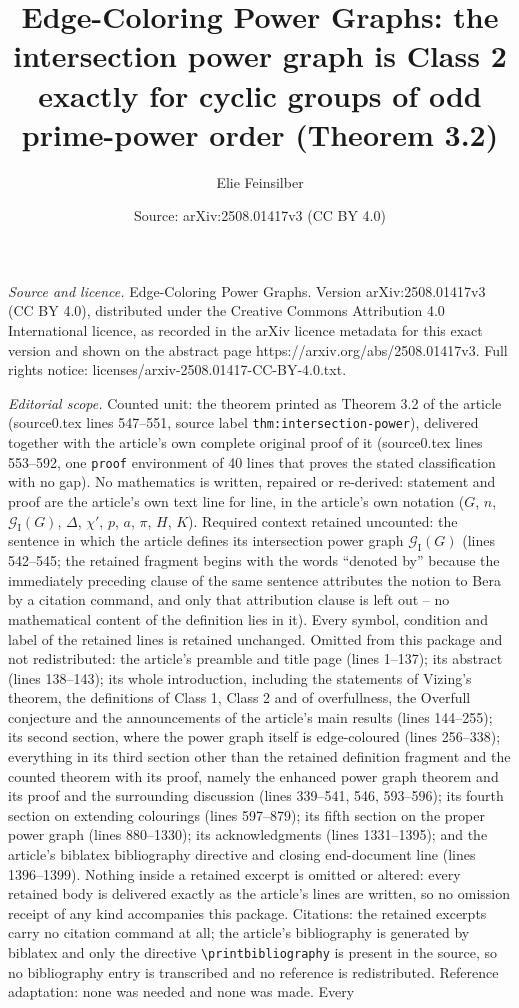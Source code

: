 \documentclass[10pt,a4paper]{amsart}
\title[Edge-coloring the intersection power graph (Theorem 3.2)]{Edge-Coloring Power Graphs: the intersection power graph is Class 2 exactly for cyclic groups of odd prime-power order (Theorem 3.2)}
\author{Elie Feinsilber}
\date{Source: arXiv:2508.01417v3 (CC BY 4.0)}
\begin{document}
\maketitle

\noindent\emph{Source and licence.} Edge-Coloring Power Graphs. Version arXiv:2508.01417v3 (CC BY 4.0), distributed under the Creative Commons Attribution 4.0 International licence, as recorded in the arXiv licence metadata for this exact version and shown on the abstract page https://arxiv.org/abs/2508.01417v3. Full rights notice: licenses/arxiv-2508.01417-CC-BY-4.0.txt.\par\smallskip

\noindent\textit{Editorial scope.} Counted unit: the theorem printed as Theorem 3.2 of the article (source0.tex lines 547--551, source label \texttt{thm:intersection-power}), delivered together with the article's own complete original proof of it (source0.tex lines 553--592, one \texttt{proof} environment of 40 lines that proves the stated classification with no gap). No mathematics is written, repaired or re-derived: statement and proof are the article's own text line for line, in the article's own notation ($G$, $n$, $\mathscr{G}_{\mathrm{I}}(G)$, $\Delta$, $\chi'$, $p$, $a$, $\pi$, $H$, $K$). Required context retained uncounted: the sentence in which the article defines its intersection power graph $\mathscr{G}_{\mathrm{I}}(G)$ (lines 542--545; the retained fragment begins with the words ``denoted by'' because the immediately preceding clause of the same sentence attributes the notion to Bera by a citation command, and only that attribution clause is left out -- no mathematical content of the definition lies in it). Every symbol, condition and label of the retained lines is retained unchanged. Omitted from this package and not redistributed: the article's preamble and title page (lines 1--137); its abstract (lines 138--143); its whole introduction, including the statements of Vizing's theorem, the definitions of Class 1, Class 2 and of overfullness, the Overfull conjecture and the announcements of the article's main results (lines 144--255); its second section, where the power graph itself is edge-coloured (lines 256--338); everything in its third section other than the retained definition fragment and the counted theorem with its proof, namely the enhanced power graph theorem and its proof and the surrounding discussion (lines 339--541, 546, 593--596); its fourth section on extending colourings (lines 597--879); its fifth section on the proper power graph (lines 880--1330); its acknowledgments (lines 1331--1395); and the article's biblatex bibliography directive and closing end-document line (lines 1396--1399). Nothing inside a retained excerpt is omitted or altered: every retained body is delivered exactly as the article's lines are written, so no omission receipt of any kind accompanies this package. Citations: the retained excerpts carry no citation command at all; the article's bibliography is generated by biblatex and only the directive \texttt{\textbackslash printbibliography} is present in the source, so no bibliography entry is transcribed and no reference is redistributed. Reference adaptation: none was needed and none was made. Every 
\end{document}
